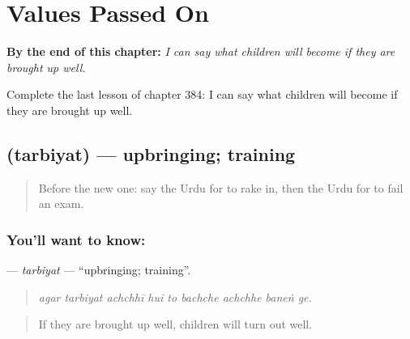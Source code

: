 
\chapter{Values Passed On}
\label{ch:ur-values-passed-on}

\begin{chapteropening}
\textbf{By the end of this chapter:} \emph{I can say what children will become if they are brought up well.}

Complete the last lesson of chapter 384: I can say what children will become if they are brought up well.
\end{chapteropening}

\section[\texorpdfstring{\ur{تربیت} (tarbiyat)}{تربیت (tarbiyat)}]{ (tarbiyat) — upbringing; training}

\label{lesson:UR-C384-tarbiyat}



\begin{quote}
Before the new one: say the Urdu for to rake in, then the Urdu for to fail an exam.
\end{quote}

\subsection*{You'll want to know: }
\textbf{} — \emph{tarbiyat} — \textquotedblleft{}upbringing; training\textquotedblright{}.

\begin{quote}
        
\end{quote}

\begin{quote}
\emph{agar tarbiyat achchhī huī to bachche achchhe baneṅ ge.}
\end{quote}

\begin{quote}
If they are brought up well, children will turn out well.
\end{quote}

